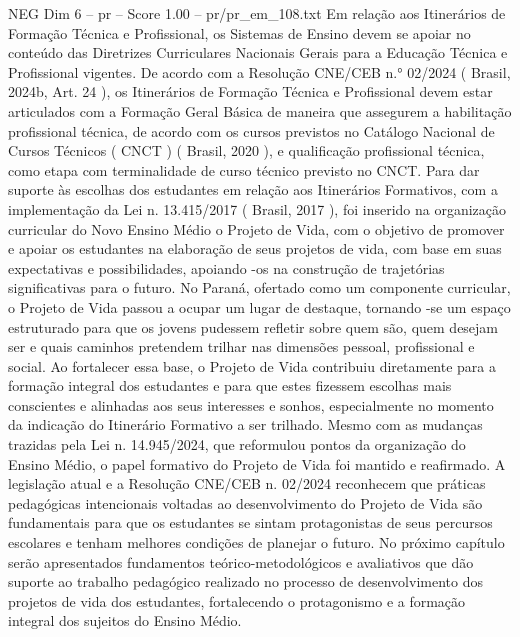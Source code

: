 \begin{textsample}{NEG Dim 6 – pr – Score 1.00 – pr/pr\_em\_108.txt}
Em relação aos Itinerários de Formação Técnica e Profissional, os Sistemas de Ensino devem se apoiar no conteúdo das Diretrizes Curriculares Nacionais Gerais para a Educação Técnica e Profissional vigentes.
De acordo com a Resolução CNE/CEB n.{\EmojiFont °} 02/2024 ( Brasil, 2024b, Art. 24 ), os Itinerários de Formação Técnica e Profissional devem estar articulados com a Formação Geral Básica de maneira que assegurem a habilitação profissional técnica, de acordo com os cursos previstos no Catálogo Nacional de Cursos Técnicos ( CNCT ) ( Brasil, 2020 ), e qualificação profissional técnica, como etapa com terminalidade de curso técnico previsto no CNCT.
Para dar suporte às escolhas dos estudantes em relação aos Itinerários Formativos, com a implementação da Lei n. 13.415/2017 ( Brasil, 2017 ), foi inserido na organização curricular do Novo Ensino Médio o Projeto de Vida, com o objetivo de promover e apoiar os estudantes na elaboração de seus projetos de vida, com base em suas expectativas e possibilidades, apoiando -os na construção de trajetórias significativas para o futuro.
No Paraná, ofertado como um componente curricular, o Projeto de Vida passou a ocupar um lugar de destaque, tornando -se um espaço estruturado para que os jovens pudessem refletir sobre quem são, quem desejam ser e quais caminhos pretendem trilhar nas dimensões pessoal, profissional e social.
Ao fortalecer essa base, o Projeto de Vida contribuiu diretamente para a formação integral dos estudantes e para que estes fizessem escolhas mais conscientes e alinhadas aos seus interesses e sonhos, especialmente no momento da indicação do Itinerário Formativo a ser trilhado.
Mesmo com as mudanças trazidas pela Lei n. 14.945/2024, que reformulou pontos da organização do Ensino Médio, o papel formativo do Projeto de Vida foi mantido e reafirmado.
A legislação atual e a Resolução CNE/CEB n. 02/2024 reconhecem que práticas pedagógicas intencionais voltadas ao desenvolvimento do Projeto de Vida são fundamentais para que os estudantes se sintam protagonistas de seus percursos escolares e tenham melhores condições de planejar o futuro.
No próximo capítulo serão apresentados fundamentos teórico-metodológicos e avaliativos que dão suporte ao trabalho pedagógico realizado no processo de desenvolvimento dos projetos de vida dos estudantes, fortalecendo o protagonismo e a formação integral dos sujeitos do Ensino Médio.

\end{textsample}
